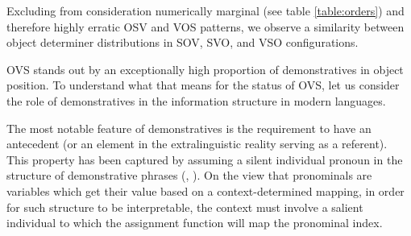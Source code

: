\documentclass[output=paper,modfonts,nonflat]{langsci/langscibook}
\begin{document}

Excluding from consideration numerically marginal (see table \ref{table:orders}) and therefore highly erratic OSV and VOS patterns, we observe a similarity between object determiner distributions in SOV, SVO, and VSO configurations. 





OVS stands out by an exceptionally high proportion of demonstratives in object position. To understand what that means for the status of OVS, let us consider the role of demonstratives in the information structure in modern languages. 

The most notable feature of demonstratives is the requirement to have an antecedent (or an element in the extralinguistic reality serving as a referent). This property has been captured by assuming a silent individual pronoun in the structure of demonstrative phrases (\citealt{Nunberg:1993}, \citealt{Elbourne:2008}). On the view that pronominals are variables which get their value based on a context-determined mapping, in order for such structure to be interpretable, the context must involve a salient individual to which the assignment function will map the pronominal index. 
\end{document}
